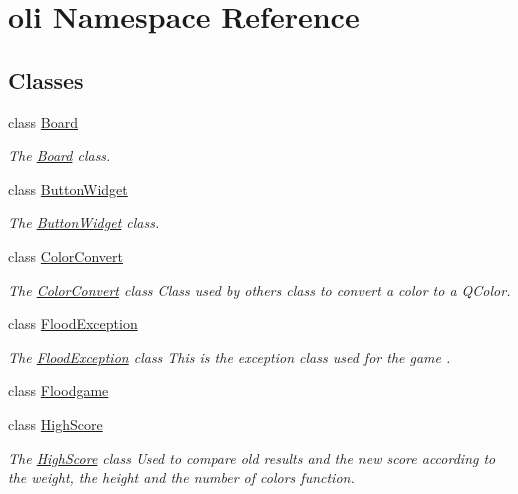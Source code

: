 \hypertarget{namespaceoli}{}\section{oli Namespace Reference}
\label{namespaceoli}
\subsection*{Classes}
\begin{DoxyCompactItemize}
\item 
class \hyperlink{classoli_1_1_board}{Board}
\begin{DoxyCompactList}\small\item\em The \hyperlink{classoli_1_1_board}{Board} class. \end{DoxyCompactList}\item 
class \hyperlink{classoli_1_1_button_widget}{Button\+Widget}
\begin{DoxyCompactList}\small\item\em The \hyperlink{classoli_1_1_button_widget}{Button\+Widget} class. \end{DoxyCompactList}\item 
class \hyperlink{classoli_1_1_color_convert}{Color\+Convert}
\begin{DoxyCompactList}\small\item\em The \hyperlink{classoli_1_1_color_convert}{Color\+Convert} class Class used by others class to convert a color to a Q\+Color. \end{DoxyCompactList}\item 
class \hyperlink{classoli_1_1_flood_exception}{Flood\+Exception}
\begin{DoxyCompactList}\small\item\em The \hyperlink{classoli_1_1_flood_exception}{Flood\+Exception} class This is the exception class used for the game . \end{DoxyCompactList}\item 
class \hyperlink{classoli_1_1_floodgame}{Floodgame}
\item 
class \hyperlink{classoli_1_1_high_score}{High\+Score}
\begin{DoxyCompactList}\small\item\em The \hyperlink{classoli_1_1_high_score}{High\+Score} class Used to compare old results and the new score according to the weight, the height and the number of colors function. \end{DoxyCompactList}\item 

\end{DoxyCompactItemize}
